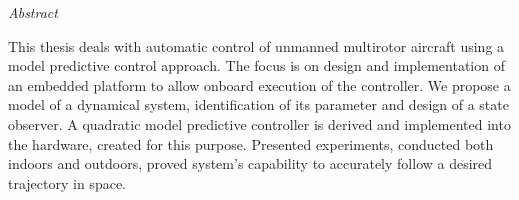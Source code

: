 \vfill
\begin{center}
{\it \large Abstract}
\vspace{0.2cm}

\begin{minipage}{0.8\textwidth}{
This thesis deals with automatic control of unmanned multirotor aircraft using a model predictive control approach. The focus is on design and implementation of an embedded platform to allow onboard execution of the controller. We propose a model of a dynamical system, identification of its parameter and design of a state observer. A quadratic model predictive controller is derived and implemented into the hardware, created for this purpose. Presented experiments, conducted both indoors and outdoors, proved system's capability to accurately follow a desired trajectory in space. 
}
\end{minipage}
\end{center}
\vfill
\vspace{1cm}
